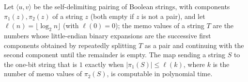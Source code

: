 \begin{theorem}
\label{Complexity.ladner_pad_guard_FP}
\leanok
{}
Let $\langle u,v\rangle$ be the self-delimiting pairing of Boolean strings, with components $\pi_1(z),\pi_2(z)$ of a string $z$ (both empty if $z$ is not a pair), and let $\ell(n)=\lfloor\log_2 n\rfloor$ (with $\ell(0)=0$); the memo values of a string $T$ are the numbers whose little-endian binary expansions are the successive first components obtained by repeatedly splitting $T$ as a pair and continuing with the second component until the remainder is empty. The map sending a string $S$ to the one-bit string that is $1$
exactly when $|\pi_1(S)|\le\ell(k)$, where $k$ is the number of memo values of $\pi_2(S)$, is
computable in polynomial time.
\end{theorem}

